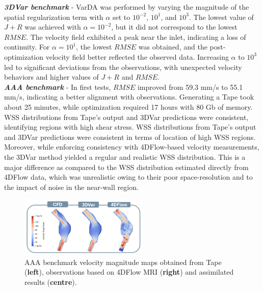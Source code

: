 \textbf{\textit{3DVar benchmark}} - VarDA was performed by varying the magnitude of the spatial regularization term with \(\alpha\) set to \(10^{-2}\), \(10^{1}\), and \(10^{3}\). The lowest value of \(J + R\) was achieved with \(\alpha = 10^{-2}\), but it did not correspond to the lowest \(RMSE\). The velocity field exhibited a peak near the inlet, indicating a loss of continuity. For \(\alpha = 10^{1}\), the lowest \(RMSE\) was obtained, and the post-optimization velocity field better reflected the observed data. Increasing \(\alpha\) to \(10^{3}\) led to significant deviations from the observations, with unexpected velocity behaviors and higher values of \(J + R\) and \(RMSE\).\\

\textbf{\textit{AAA benchmark}} - In first tests, \(RMSE\) improved from 59.3 mm/s to 55.1 mm/s, indicating a better alignment with observations. Generating a Tape took about 25 minutes, while optimization required 17 hours with 80 Gb of memory. WSS distributions from Tape's output and 3DVar predictions were consistent, identifying regions with high shear stress. WSS distributions from Tape's output and 3DVar predictions were consistent in terms of location of high WSS regions. Moreover, while enforcing consistency with 4DFlow-based velocity measurements, the 3DVar method yielded a regular and realistic WSS distribution. This is a major difference as compared to the WSS distribution estimated directly from 4DFlow data, which was unrealistic owing to their poor space-resolution and to the impact of noise in the near-wall region.

\begin{figure}
    \centering
    \includegraphics[width=0.55\textwidth, height = 0.15\textheight]{chapters/chp1/graphics/RealData3DVar.JPG}
    \caption{\small AAA benchmark velocity magnitude maps obtained from Tape (\textbf{left}), observations based on 4DFlow MRI (\textbf{right}) and assimilated results (\textbf{centre}).}
    \label{fig:3.7}
\end{figure}

